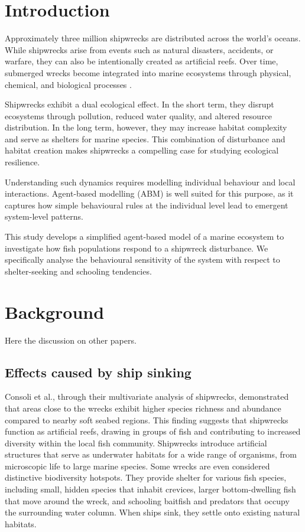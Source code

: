 \documentclass[10pt,a4paper,twocolumn]{article}
\begin{document}
\section{Introduction}

Approximately three million shipwrecks are distributed across the world’s oceans. While shipwrecks arise from events such as natural disasters, accidents, or warfare, they can also be intentionally created as artificial reefs. Over time, submerged wrecks become integrated into marine ecosystems through physical, chemical, and biological processes \citep{ShipsPaxton}.

Shipwrecks exhibit a dual ecological effect. In the short term, they disrupt ecosystems through pollution, reduced water quality, and altered resource distribution. In the long term, however, they may increase habitat complexity and serve as shelters for marine species. This combination of disturbance and habitat creation makes shipwrecks a compelling case for studying ecological resilience.

Understanding such dynamics requires modelling individual behaviour and local interactions. Agent-based modelling (ABM) is well suited for this purpose, as it captures how simple behavioural rules at the individual level lead to emergent system-level patterns.

This study develops a simplified agent-based model of a marine ecosystem to investigate how fish populations respond to a shipwreck disturbance. We specifically analyse the behavioural sensitivity of the system with respect to shelter-seeking and schooling tendencies.

\section{Background}
Here the discussion on other papers.
\subsection{Effects caused by ship sinking}
Consoli et al., through their multivariate analysis of shipwrecks, demonstrated that areas close to the wrecks exhibit higher species richness and abundance compared to nearby soft seabed regions. This finding suggests that shipwrecks function as artificial reefs, drawing in groups of fish and contributing to increased diversity within the local fish community.\cite{effectShipwrecks}
Shipwrecks introduce artificial structures that serve as underwater habitats for a wide range of organisms, from microscopic life to large marine species. Some wrecks are even considered distinctive biodiversity hotspots. They provide shelter for various fish species, including small, hidden species that inhabit crevices, larger bottom-dwelling fish that move around the wreck, and schooling baitfish and predators that occupy the surrounding water column. When ships sink, they settle onto existing natural habitats. \cite{ShipsPaxton}
\end{document}
